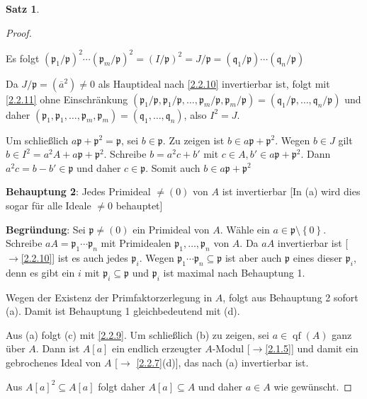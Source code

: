 \documentclass[
twoside=semi,
fontsize=12,
DIV=12, 
cleardoublepage=current,
leqno,
headings=optiontoheadandtoc, 
toc=idx
]{scrbook}
\newcommand{\set}[1]{\left\{ #1 \right\}}
\DeclareMathOperator{\qf}{qf}
\theoremstyle{definition}
\newtheorem{satz}[definition]{Satz}
\begin{document}
\begin{satz}
\begin{proof}
\begin{tcolorbox}[colback=white,colframe=blue,arc=0cm]
	 			Es folgt $(\mathfrak{p}_1/\mathfrak{p})^2 \cdots (\mathfrak{p}_m/\mathfrak{p})^2 = (I/\mathfrak{p})^2 = J/\mathfrak{p} = (\mathfrak{q}_1/\mathfrak{p})\cdots (\mathfrak{q}_n/\mathfrak{p})$
	 			
	 			Da $J/\mathfrak{p} = (\overline{a}^2) \neq 0$ als Hauptideal nach \ref{2.2.10} invertierbar ist, folgt mit \ref{2.2.11} ohne Einschr\"ankung $(\mathfrak{p}_1/\mathfrak{p}, \mathfrak{p}_1/\mathfrak{p}, \dots, \mathfrak{p}_m/\mathfrak{p}, \mathfrak{p}_m/\mathfrak{p}) = (\mathfrak{q}_1/\mathfrak{p},\dots, \mathfrak{q}_n/\mathfrak{p})$  und daher \linebreak
	 			$(\mathfrak{p}_1,\mathfrak{p}_1,\dots,\mathfrak{p}_m,\mathfrak{p}_m) = (\mathfrak{q}_1,\dots,\mathfrak{q}_n)$, also $I^2 = J$.
	 			
	 			Um schlie\ss lich $a\mathfrak{p} + \mathfrak{p}^2 = \mathfrak{p}$, sei $b \in \mathfrak{p}$. Zu zeigen ist $b \in a\mathfrak{p} + \mathfrak{p}^2$. Wegen $b \in J$ gilt $b \in I^2 = a^2A + a\mathfrak{p}+ \mathfrak{p}^2$. Schreibe $b = a^2c + b'$ mit $c \in A, b' \in a\mathfrak{p}+\mathfrak{p}^2$. Dann $a^2c = b - b' \in \mathfrak{p}$ und daher $c \in \mathfrak{p}$. Somit auch $b \in a \mathfrak{p} + \mathfrak{p}^2$
 			\end{tcolorbox}
 			
 			\begin{tcolorbox}[colback=white,colframe=blue,arc=0cm]
	 			\textbf{Behauptung 2}: Jedes Primideal $\neq (0)$ von $A$ ist invertierbar [In (a) wird dies sogar f\"ur alle Ideale $\neq 0$ behauptet]
	 			
	 			\tcblower 
	 			\textbf{Begr\"undung}: Sei $\mathfrak{p} \neq (0)$ ein Primideal von $A$. W\"ahle ein $a \in \mathfrak{p}\setminus \set{0}$. Schreibe $aA = \mathfrak{p}_1 \cdots \mathfrak{p}_n$ mit Primidealen $\mathfrak{p}_1,\dots, \mathfrak{p}_n$ von $A$. Da $aA$ invertierbar ist [$\to$\ref{2.2.10}] ist es auch jedes $\mathfrak{p}_i$. Wegen $\mathfrak{p}_1\cdots \mathfrak{p}_n \subseteq \mathfrak{p}$ ist aber auch $\mathfrak{p}$ eines dieser $\mathfrak{p}_i$, denn es gibt ein $i$ mit $\mathfrak{p}_i \subseteq \mathfrak{p}$ und $\mathfrak{p}_i$ ist maximal nach Behauptung 1.
 			\end{tcolorbox}
 			
 			\medskip\noindent Wegen der Existenz der Primfaktorzerlegung in $A$, folgt aus Behauptung 2 sofort (a). Damit ist Behauptung 1 gleichbedeutend mit (d). 
 			
 			Aus (a) folgt (c) mit \ref{2.2.9}. Um schlie\ss lich (b) zu zeigen, sei $a \in \qf(A)$ ganz \"uber $A$. Dann ist $A[a]$ ein endlich erzeugter $A$-Modul [$\to$\ref{2.1.5}] und damit ein gebrochenes Ideal von $A$ [$\to$ \ref{2.2.7}(d)], das nach (a) invertierbar ist. 
 			
 			Aus $A[a]^2 \subseteq A[a]$ folgt daher $A[a] \subseteq A$ und daher $a \in A$ wie gew\"unscht.
   		\end{proof}
   	 \end{satz}
   	\newpage
   		
\end{document}
